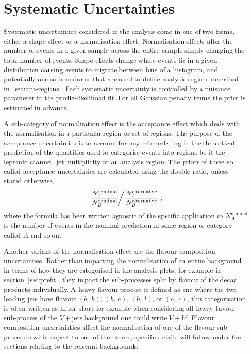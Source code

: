 \chapter{Systematic Uncertainties}%
\label{ch:systematics}

Systematic uncertainties considered in the analysis come in one of two forms,
either a shape effect or a normalisation effect. Normalisation effects alter the
number of events in a given sample across the entire sample simply changing the
total number of events. Shape effects change where events lie in a given
distribution causing events to migrate between bins of a histogram, and
potentially across boundaries that are used to define analysis regions described
in~\ref{sec:ana-regions}. Each systematic uncertainty is controlled by a
nuisance parameter in the profile-likelihood fit. For all Gaussian penalty terms
the prior is estimated in advance.

A sub-category of normalisation effect is the acceptance effect which deals with
the normalisation in a particular region or set of regions. The purpose of the
acceptance uncertainties is to account for any mismodelling in the theoretical
prediction of the quantities used to categorise events into regions be it the
leptonic channel, jet multiplicity or an analysis region. The priors of these so
called acceptance uncertainties are calculated using the double ratio, unless
stated otherwise,
\begin{equation}
  \left. \dfrac{N_{A}^{\text{nominal}}}{N_{B}^{\text{nominal}}} \middle/
    \dfrac{N_{A}^{\text{alternative}}}{N_{B}^{\text{alternative}}} \right.,
  \label{eq:acceptance-dr}
\end{equation}
where the formula has been written agnostic of the specific application so
$N_{A}^{\text{nominal}}$ is the number of  events in the nominal prediction in some
region or category called $A$ and so on.

Another variant of the normalisation effect are the flavour composition
uncertainties. Rather than impacting the normalisation of an entire background
in terms of how they are categorised in the analysis plots, for example in
section~\ref{sec:prefit}, they impact the sub-processes split by flavour of the
decay products individually. A heavy flavour process is defined as one where the
two leading jets have flavour $(b,~b)$, $(b,~c)$, $(b,~l)$, or $(c,~c)$,
this categorisation is often written as hf for short for example when
considering all heavy flavour sub-process of the $V+$jets background one could
write $V+$hf. Flavour composition uncertainties affect the normalisation of one
of the flavour sub-processes with respect to one of the others, specific details
will follow under the sections relating to the relevant backgrounds.

